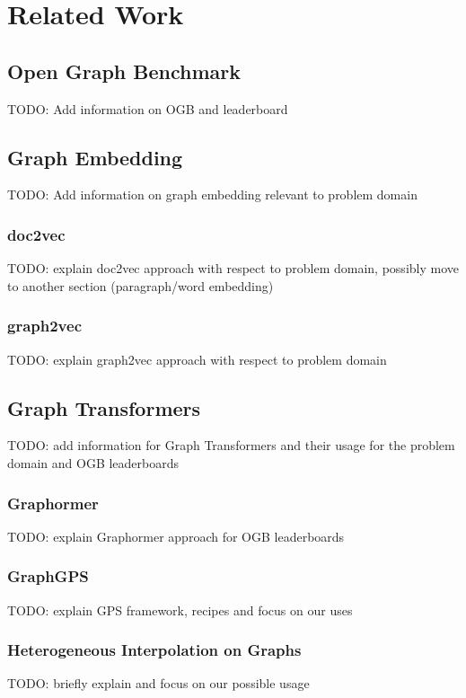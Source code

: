 \section{Related Work}

\subsection{Open Graph Benchmark}
TODO: Add information on OGB and leaderboard

\subsection{Graph Embedding}
TODO: Add information on graph embedding relevant to problem domain

\subsubsection{doc2vec}
TODO: explain doc2vec approach with respect to problem domain, possibly move to another section (paragraph/word embedding)

\subsubsection{graph2vec}
TODO: explain graph2vec approach with respect to problem domain

\subsection{Graph Transformers}
TODO: add information for Graph Transformers and their usage for the problem domain and OGB leaderboards

\subsubsection{Graphormer}
TODO: explain Graphormer approach for OGB leaderboards

\subsubsection{GraphGPS}
TODO: explain GPS framework, recipes and focus on our uses

\subsubsection{Heterogeneous Interpolation on Graphs}
TODO: briefly explain and focus on our possible usage
